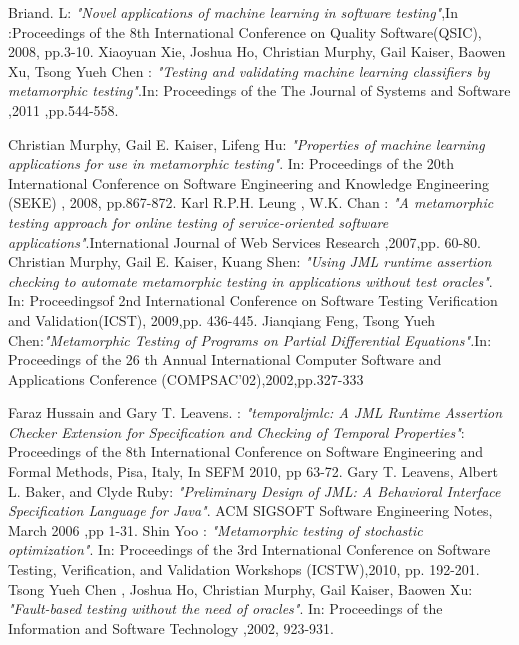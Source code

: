 
\begin{thebibliography}{99}
\label{Bibliography}


Briand. L:
{\it{"Novel applications of machine learning in software testing"}},In :Proceedings of the 8th International Conference on Quality Software(QSIC), 2008, pp.3-10.
Xiaoyuan Xie, Joshua Ho, Christian Murphy, Gail Kaiser, Baowen Xu, Tsong Yueh Chen :
{\it{"Testing and validating machine learning classifiers by metamorphic testing"}}.In: Proceedings of the The Journal of Systems and Software  ,2011 ,pp.544-558.

Christian Murphy, Gail E. Kaiser, Lifeng Hu:
{\it{"Properties of machine learning applications for use in metamorphic testing"}}. In: Proceedings of the 20th International Conference on Software Engineering and Knowledge Engineering (SEKE) , 2008, pp.867-872.
Karl R.P.H. Leung , W.K. Chan :
{\it{"A metamorphic testing approach for online testing of service-oriented software applications"}}.International Journal of Web Services Research ,2007,pp. 60-80.
Christian Murphy, Gail E. Kaiser, Kuang Shen:
{\it{"Using JML runtime assertion checking to automate metamorphic testing in applications without test oracles"}}. In: Proceedingsof 2nd International Conference on Software Testing Verification and Validation(ICST), 2009,pp. 436-445.
Jianqiang Feng, Tsong Yueh Chen:{\it{"Metamorphic Testing of Programs on Partial Differential Equations".}}In: Proceedings of the 26 th Annual International Computer Software and Applications Conference (COMPSAC'02),2002,pp.327-333

Faraz Hussain and Gary T. Leavens. :
{\it{"temporaljmlc: A JML Runtime Assertion Checker Extension for Specification and Checking of Temporal Properties"}}: Proceedings of the 8th International Conference on Software Engineering and Formal Methods, Pisa, Italy, In SEFM 2010, pp 63-72.
Gary T. Leavens, Albert L. Baker, and Clyde Ruby:
{\it{"Preliminary Design of JML: A Behavioral Interface Specification Language for Java"}}. ACM SIGSOFT Software Engineering Notes, March 2006 ,pp 1-31.
 Shin Yoo :
{\it{"Metamorphic testing of stochastic optimization"}}. In: Proceedings of the 3rd International Conference on Software Testing, Verification, and Validation Workshops (ICSTW),2010, pp. 192-201.
Tsong Yueh Chen , Joshua Ho, Christian Murphy, Gail Kaiser, Baowen Xu:
{\it{ "Fault-based testing without the need of oracles"}}. In: Proceedings of the Information and Software Technology ,2002, 923-931.


\end{thebibliography}
